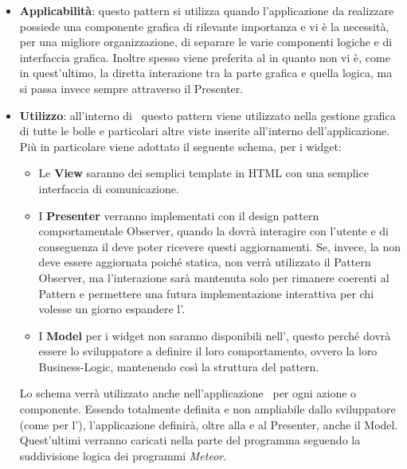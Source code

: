 \begin{itemize}
	\item \textbf{Applicabilità}: questo pattern si utilizza quando l'applicazione da realizzare possiede una componente grafica di rilevante importanza e vi è la necessità, per una migliore organizzazione, di separare le varie componenti logiche e di interfaccia grafica. Inoltre spesso viene preferita al  in quanto non vi è, come in quest'ultimo, la diretta interazione tra la parte grafica e quella logica, ma si passa invece sempre attraverso il Presenter.
	\item \textbf{Utilizzo}: all'interno di \progettoShort\ questo pattern viene utilizzato nella gestione grafica di tutte le bolle e particolari altre viste inserite all'interno dell'applicazione. Più in particolare viene adottato il seguente schema, per i widget:
\begin{itemize}
\item Le \textbf{View} saranno dei semplici template in HTML con una semplice interfaccia di comunicazione.
\item I \textbf{Presenter} verranno implementati con il design pattern comportamentale Observer, quando la  dovrà interagire con l'utente e di conseguenza il  deve poter ricevere questi aggiornamenti. Se, invece, la  non deve essere aggiornata poiché statica, non verrà utilizzato il Pattern Observer, ma l'interazione sarà mantenuta solo per rimanere coerenti al Pattern e permettere una futura implementazione interattiva per chi volesse un giorno espandere l'.
\item I \textbf{Model} per i widget non saranno disponibili nell', questo perché dovrà essere lo sviluppatore a definire il loro  comportamento, ovvero la loro Business-Logic, mantenendo così la struttura del pattern.
\end{itemize}
Lo schema  verrà utilizzato anche nell'applicazione \app\ per ogni azione o componente.
Essendo totalmente definita e non ampliabile dallo sviluppatore (come per l'), l'applicazione definirà, oltre alla  e al Presenter, anche il Model. Quest'ultimi verranno caricati nella parte  del programma seguendo la suddivisione logica dei programmi \textit{Meteor}.
\end{itemize}

